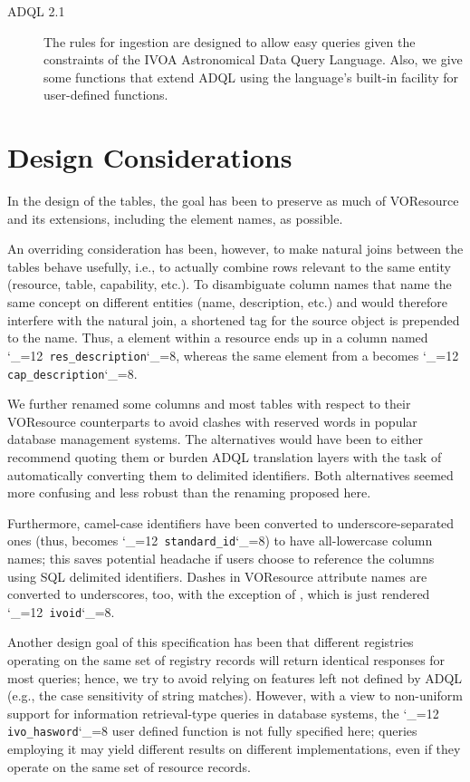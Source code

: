 \documentclass[11pt,a4paper]{ivoa}
\makeatletter
\def\rtent#1{\texttt{\color{rtcolor}\verb|#1|}}
\def\makeunderscoreletter{\catcode`\_=12}
\def\makeunderscoresubscript{\catcode`\_=8}
\def\rtent{\makeunderscoreletter\relax\rt@nt}
\def\rt@nt#1{\texttt{\color{rtcolor} #1}\makeunderscoresubscript{}}
\makeatother
\begin{document}
\begin{description}
\item[ADQL 2.1 \citep{2023ivoa.spec.1215M}] The rules for ingestion are designed to allow
easy queries given the constraints of the IVOA Astronomical Data Query
Language.  Also, we give some functions that extend ADQL using the
language's built-in facility for user-defined functions.
\end{description}


\section{Design Considerations}

\label{design}

In the design of the tables, the goal has been to preserve as much of
VOResource and its extensions, including the element names, as
possible.

An overriding consideration has been, however, to make natural joins
between the tables behave usefully, i.e., to actually combine rows
relevant to the same entity (resource, table, capability, etc.).
To disambiguate column names that name the same concept on different
entities (name, description, etc.) and would therefore interfere with
the natural join, a shortened tag for the source object
is prepended to the name.  Thus, a  element within
a resource ends up in a column named
\rtent{res_description}, whereas the same element from a
 becomes \rtent{cap_description}.

We further renamed some columns and most tables
with respect to their VOResource
counterparts to avoid clashes with reserved words in popular database
management systems.  The alternatives would have been to either recommend
quoting them or burden ADQL translation layers with the task of
automatically converting them to delimited identifiers.  Both
alternatives seemed more confusing and less robust than the renaming
proposed here.

Furthermore, camel-case identifiers have been converted to
underscore-separated ones (thus,   becomes
\rtent{standard_id}) to have all-lowercase column names; this saves
potential headache if users choose to reference the columns using SQL
delimited identifiers.  Dashes in VOResource attribute names are
converted to underscores, too, with the exception of
, which is just rendered \rtent{ivoid}.

Another design goal of this specification has been that different registries
operating on the same set of registry records will return identical responses
for most queries; hence, we try to avoid relying on features left not
defined by ADQL (e.g., the case sensitivity of string matches).  However,
with a view to non-uniform support for information retrieval-type
queries in database systems, the \rtent{ivo_hasword} user defined
function is not fully specified here; queries employing it may yield
different results on different implementations, even if they operate on
the same set of resource records.
\end{document}
